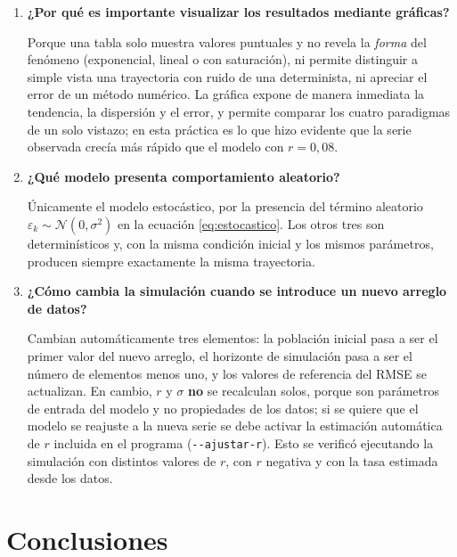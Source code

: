 \documentclass[11pt,a4paper]{article}
\begin{document}
\begin{enumerate}[leftmargin=*]
  \item \textbf{¿Por qu\'e es importante visualizar los resultados mediante gr\'aficas?}

  Porque una tabla solo muestra valores puntuales y no revela la \emph{forma} del
  fen\'omeno (exponencial, lineal o con saturaci\'on), ni permite distinguir a simple vista
  una trayectoria con ruido de una determinista, ni apreciar el error de un m\'etodo
  num\'erico. La gr\'afica expone de manera inmediata la tendencia, la dispersi\'on y el
  error, y permite comparar los cuatro paradigmas de un solo vistazo; en esta pr\'actica
  es lo que hizo evidente que la serie observada crec\'ia m\'as r\'apido que el modelo con
  $r = 0{,}08$.

  \item \textbf{¿Qu\'e modelo presenta comportamiento aleatorio?}

  \'Unicamente el modelo estoc\'astico, por la presencia del t\'ermino aleatorio
  $\varepsilon_k \sim \mathcal{N}(0,\sigma^{2})$ en la ecuaci\'on \eqref{eq:estocastico}.
  Los otros tres son determin\'isticos y, con la misma condici\'on inicial y los mismos
  par\'ametros, producen siempre exactamente la misma trayectoria.

  \item \textbf{¿C\'omo cambia la simulaci\'on cuando se introduce un nuevo arreglo de
  datos?}

  Cambian autom\'aticamente tres elementos: la poblaci\'on inicial pasa a ser el primer
  valor del nuevo arreglo, el horizonte de simulaci\'on pasa a ser el n\'umero de elementos
  menos uno, y los valores de referencia del RMSE se actualizan. En cambio, $r$ y $\sigma$
  \textbf{no} se recalculan solos, porque son par\'ametros de entrada del modelo y no
  propiedades de los datos; si se quiere que el modelo se reajuste a la nueva serie se debe
  activar la estimaci\'on autom\'atica de $r$ incluida en el programa
  (\texttt{-{}-ajustar-r}). Esto se verific\'o ejecutando la simulaci\'on con distintos
  valores de $r$, con $r$ negativa y con la tasa estimada desde los datos.

\end{enumerate}

\section{Conclusiones}
\end{document}

